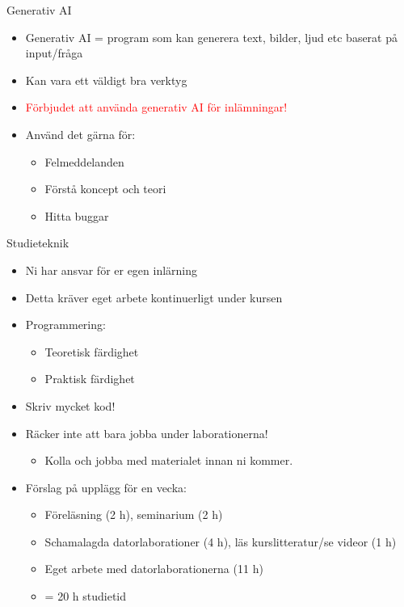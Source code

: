 \documentclass[
  10pt,
  ignorenonframetext,
]{beamer}
\providecommand{\tightlist}{%
  \setlength{\itemsep}{0pt}\setlength{\parskip}{0pt}}
\begin{document}
\begin{frame}{Generativ AI}
\protect\hypertarget{Generativ AI}{}
\begin{itemize}
\tightlist
\item
  Generativ AI = program som kan generera text, bilder, ljud etc baserat på input/fråga
\item
  Kan vara ett väldigt bra verktyg
\item
  \textcolor{red}{Förbjudet att använda generativ AI för inlämningar!}
\item
  Använd det gärna för:

  \begin{itemize}
  \tightlist
  \item
    Felmeddelanden
  \item
    Förstå koncept och teori
  \item
    Hitta buggar
  \end{itemize}
\end{itemize}
\end{frame}

\begin{frame}{Studieteknik}
\protect\hypertarget{studieteknik}{}
\begin{itemize}
\tightlist
\item
  Ni har ansvar för er egen inlärning
\item
  Detta kräver eget arbete kontinuerligt under kursen
\item
  Programmering:

  \begin{itemize}
  \tightlist
  \item
    Teoretisk färdighet
  \item
    Praktisk färdighet
  \end{itemize}
\item
  Skriv mycket kod!
\item
  Räcker inte att bara jobba under laborationerna!

  \begin{itemize}
  \tightlist
  \item
    Kolla och jobba med materialet innan ni kommer.
  \end{itemize}
\item
  Förslag på upplägg för en vecka:
  \begin{itemize}
  \tightlist
  \item
    Föreläsning (2 h), seminarium (2 h)
  \item
    Schamalagda datorlaborationer (4 h), läs kurslitteratur/se videor (1 h)
  \item
    Eget arbete med datorlaborationerna (11 h)
  \item
    = 20 h studietid
  \end{itemize}
  
\end{itemize}
\end{frame}
\end{document}
